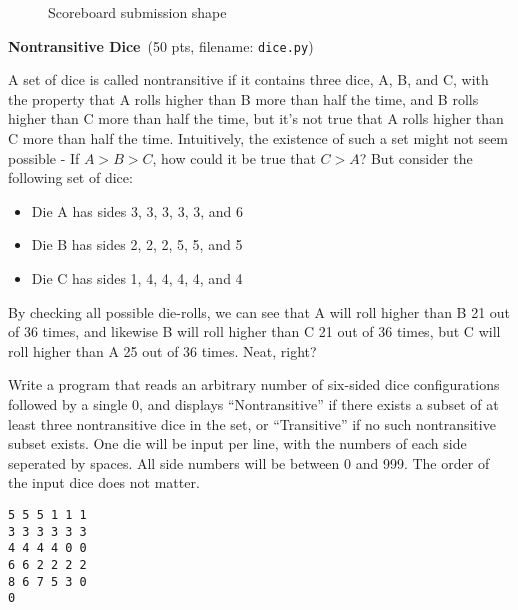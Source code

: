 \documentclass[11pt]{cselabheader}
\newcommand{\cop}[3]{\textbf{#1}~(#2 pts, filename: \texttt{#3})\quad}
\theoremstyle{plain}
\begin{document}
\begin{enumerate}
\begin{figure}[!ht]
      \caption{Scoreboard submission shape}
    \end{figure}

  \item \cop{Nontransitive Dice}{50}{dice.py}

    A set of dice is called nontransitive if it contains three dice,
    A, B, and C, with the property that A rolls higher than B more
    than half the time, and B rolls higher than C more than half
    the time, but it's not true that A rolls higher than C more than
    half the time. Intuitively, the existence of such a set might not
    seem possible - If $A > B > C$, how could it be true that $C > A$?
    But consider the following set of dice:

    \begin{itemize}
      \item Die A has sides 3, 3, 3, 3, 3, and 6
      \item Die B has sides 2, 2, 2, 5, 5, and 5
      \item Die C has sides 1, 4, 4, 4, 4, and 4
    \end{itemize}
    By checking all possible die-rolls, we can see that A will roll
    higher than B 21 out of 36 times, and likewise B will roll higher
    than C 21 out of 36 times, but C will roll higher than A 25 out
    of 36 times. Neat, right?

    Write a program that reads an arbitrary number of six-sided dice
    configurations followed by a single 0, and displays
    ``Nontransitive'' if there exists a subset of at least three
    nontransitive dice in the set, or ``Transitive'' if no such
    nontransitive subset exists. One die will be input per line,
    with the numbers of each side seperated by spaces. All side
    numbers will be between 0 and 999. The order of the input dice
    does not matter.

    \begin{minipage}{.5\linewidth}
      \begin{minipage}{.9\linewidth}
        \begin{lstlisting}[style=bash]
5 5 5 1 1 1
3 3 3 3 3 3
4 4 4 4 0 0
6 6 2 2 2 2
8 6 7 5 3 0
0


\end{lstlisting}
\end{minipage}
\end{minipage}
\end{enumerate}
\end{document}
